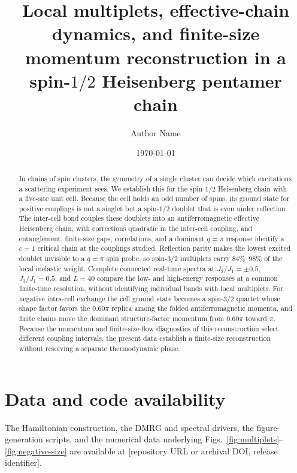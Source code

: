 \documentclass[
  aps,
  prb,
  reprint,
  amsmath,
  amssymb,
  superscriptaddress,
  longbibliography,
  nofootinbib,
  floatfix
]{revtex4-2}
\begin{document}
\title{Local multiplets, effective-chain dynamics, and finite-size momentum
reconstruction in a spin-\texorpdfstring{$1/2$}{1/2} Heisenberg pentamer chain}

\author{Author Name}

\date{\today}

\begin{abstract}
In chains of spin clusters, the symmetry of a single cluster can decide which
excitations a scattering experiment sees.
We establish this for the spin-$1/2$ Heisenberg chain with a five-site unit cell.
Because the cell holds an odd number of spins, its ground state for positive
couplings is not a singlet but a spin-$1/2$ doublet that is even under reflection.
The inter-cell bond couples these doublets into an antiferromagnetic effective
Heisenberg chain, with corrections quadratic in the inter-cell coupling, and
entanglement, finite-size gaps, correlations, and a dominant $q=\pi$ response
identify a $c=1$ critical chain at the couplings studied.
Reflection parity makes the lowest excited doublet invisible to a $q=\pi$ spin
probe, so spin-$3/2$ multiplets carry $84\%$--$98\%$ of the local inelastic
weight.
Complete connected real-time spectra at $J_2/J_1=\pm0.5$, $J_3/J_1=0.5$, and
$L=40$ compare the low- and high-energy responses at a common finite-time
resolution, without identifying individual bands with local multiplets.
For negative intra-cell exchange the cell ground state becomes a spin-$3/2$
quartet whose shape factor favors the $0.60\pi$ replica among the folded
antiferromagnetic momenta, and finite chains move the dominant structure-factor
momentum from $0.60\pi$ toward $\pi$.
Because the momentum and finite-size-flow diagnostics of this reconstruction
select different coupling intervals, the present data establish a finite-size
reconstruction without resolving a separate thermodynamic phase.
\end{abstract}

\maketitle







\begin{acknowledgments}
\end{acknowledgments}

\section*{Data and code availability}
The Hamiltonian construction, the DMRG and spectral drivers, the figure-generation
scripts, and the numerical data underlying
Figs.~\ref{fig:multiplets}--\ref{fig:negative-size} are available at
[repository URL or archival DOI, release identifier].

\setlength{\bibsep}{2.0pt plus 0.3ex}

\end{document}
